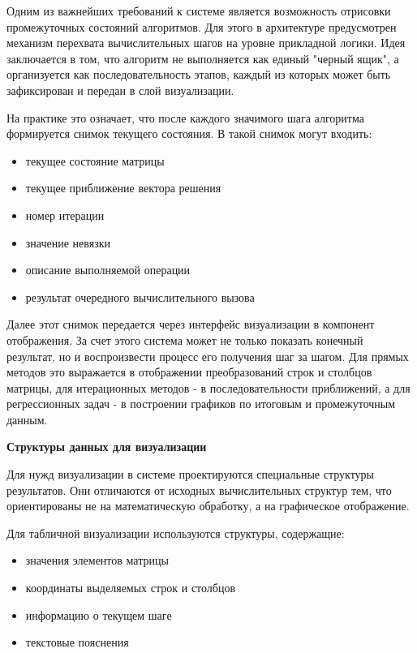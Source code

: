 \documentclass[12pt, oneside]{book}
\begin{document}
    \quad Одним из важнейших требований к системе является возможность отрисовки промежуточных состояний алгоритмов. Для этого в архитектуре предусмотрен механизм перехвата вычислительных шагов на уровне прикладной логики. Идея заключается в том, что алгоритм не выполняется как единый "черный ящик", а организуется как последовательность этапов, каждый из которых может быть зафиксирован и передан в слой визуализации.

    \quad На практике это означает, что после каждого значимого шага алгоритма формируется снимок текущего состояния. В такой снимок могут входить:

    \begin{itemize}
        \item текущее состояние матрицы
        \item текущее приближение вектора решения
        \item номер итерации
        \item значение невязки
        \item описание выполняемой операции
        \item результат очередного вычислительного вызова
    \end{itemize}

    \quad Далее этот снимок передается через интерфейс визуализации в компонент отображения. За счет этого система может не только показать конечный результат, но и воспроизвести процесс его получения шаг за шагом. Для прямых методов это выражается в отображении преобразований строк и столбцов матрицы, для итерационных методов - в последовательности приближений, а для регрессионных задач - в построении графиков по итоговым и промежуточным данным.

    \vspace{0.5em}

    \textbf{\large Структуры данных для визуализации}

    \vspace{0.5em}


    \quad Для нужд визуализации в системе проектируются специальные структуры результатов. Они отличаются от исходных вычислительных структур тем, что ориентированы не на математическую обработку, а на графическое отображение.
    
    \quad Для табличной визуализации используются структуры, содержащие:

    \begin{itemize}
        \item значения элементов матрицы
        \item координаты выделяемых строк и столбцов
        \item информацию о текущем шаге
        \item текстовые пояснения
    \end{itemize}
\end{document}
